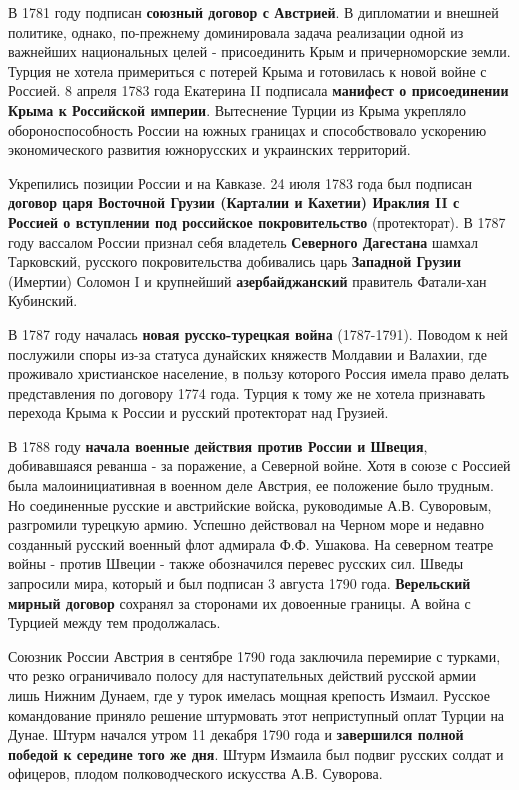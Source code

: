 \documentclass{article}
\begin{document}
В 1781 году подписан \textbf{союзный договор с Австрией}. В дипломатии и внешней политике, однако, по-прежнему доминировала задача реализации одной из важнейших национальных целей - присоединить Крым и причерноморские земли. Турция не хотела примериться с потерей Крыма и готовилась к новой войне с Россией. 8 апреля 1783 года Екатерина II подписала \textbf{манифест о присоединении Крыма к Российской империи}. Вытеснение Турции из Крыма укрепляло обороноспособность России на южных границах и способствовало ускорению экономического развития южнорусских и украинских территорий.

\hfill

Укрепились позиции России и на Кавказе. 24 июля 1783 года был подписан \textbf{договор царя Восточной Грузии (Карталии и Кахетии) Ираклия II с Россией о вступлении под российское покровительство} (протекторат). В 1787 году вассалом России признал себя владетель \textbf{Северного Дагестана} шамхал Тарковский, русского покровительства добивались царь \textbf{Западной Грузии} (Имертии) Соломон I и крупнейший \textbf{азербайджанский} правитель Фатали-хан Кубинский.

\hfill

В 1787 году началась \textbf{новая русско-турецкая война} (1787-1791). Поводом к ней послужили споры из-за статуса дунайских княжеств Молдавии и Валахии, где проживало христианское население, в пользу которого Россия имела право делать представления по договору 1774 года. Турция к тому же не хотела признавать перехода Крыма к России и русский протекторат над Грузией.

В 1788 году \textbf{начала военные действия против России и Швеция}, добивавшаяся реванша - за поражение, а Северной войне. Хотя в союзе с Россией была малоинициативная в военном деле Австрия, ее положение было трудным. Но соединенные русские и австрийские войска, руководимые А.В. Суворовым, разгромили турецкую армию. Успешно действовал на Черном море и недавно созданный русский военный флот адмирала Ф.Ф. Ушакова. На северном театре войны - против Швеции - также обозначился перевес русских сил. Шведы запросили мира, который и был подписан 3 августа 1790 года. \textbf{Верельский мирный договор} сохранял за сторонами их довоенные границы. А война с Турцией между тем продолжалась.

Союзник России Австрия в сентябре 1790 года заключила перемирие с турками, что резко ограничивало полосу для наступательных действий русской армии лишь Нижним Дунаем, где у турок имелась мощная крепость Измаил. Русское командование приняло решение штурмовать этот неприступный оплат Турции на Дунае. Штурм начался утром 11 декабря 1790 года и \textbf{завершился полной победой к середине того же дня}. Штурм Измаила был подвиг русских солдат и офицеров, плодом полководческого искусства А.В. Суворова. 
\end{document}
